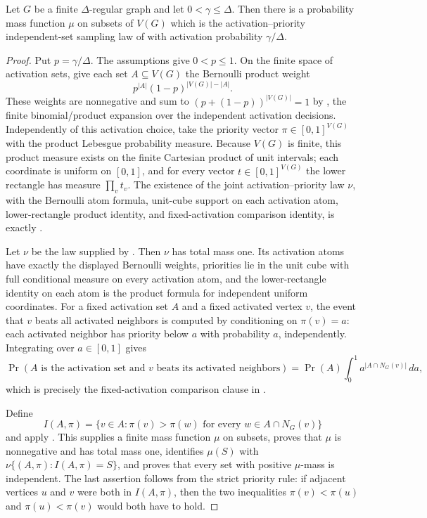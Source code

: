 \begin{lemma}
Let $G$ be a finite $\Delta$-regular graph and let $0<\gamma\le\Delta$.
Then there is a probability mass function $\mu$ on subsets of $V(G)$ which is
the activation--priority independent-set sampling law of
 with activation probability
$\gamma/\Delta$.
\end{lemma}
\begin{proof}
Put $p=\gamma/\Delta$.  The assumptions give $0<p\le 1$.  On the finite
space of activation sets, give each set $A\subseteq V(G)$ the Bernoulli
product weight
\[
p^{|A|}(1-p)^{|V(G)|-|A|}.
\]
These weights are nonnegative and sum to $(p+(1-p))^{|V(G)|}=1$ by
, the finite binomial/product
expansion over the independent activation decisions.
Independently of this activation choice, take the priority vector
\(\pi\in[0,1]^{V(G)}\) with the product Lebesgue probability measure.  Because
\(V(G)\) is finite, this product measure exists on the finite Cartesian
product of unit intervals; each coordinate is uniform on $[0,1]$, and for
every vector \(t\in[0,1]^{V(G)}\) the lower rectangle has measure
\(\prod_v t_v\).  The existence of the joint activation--priority law
\(\nu\), with the Bernoulli atom formula, unit-cube support on each activation
atom, lower-rectangle product identity, and fixed-activation comparison
identity, is exactly .

Let \(\nu\) be the law supplied by
.  Then \(\nu\) has total mass
one.  Its activation atoms have exactly the displayed Bernoulli weights,
priorities lie in the unit cube with full conditional measure on every
activation atom, and the lower-rectangle identity on each atom is the product
formula for independent uniform coordinates.
For a fixed activation set \(A\) and a fixed activated vertex \(v\), the event
that \(v\) beats all activated neighbors is computed by conditioning on
\(\pi(v)=a\): each activated neighbor has priority below \(a\) with
probability \(a\), independently.  Integrating over \(a\in[0,1]\) gives
\[
\Pr(A\text{ is the activation set and }v\text{ beats its activated
neighbors})
=\Pr(A)\int_0^1 a^{|A\cap N_G(v)|}\,da,
\]
which is precisely the fixed-activation comparison clause in
.

Define
\[
I(A,\pi)=\{v\in A:\pi(v)>\pi(w)\text{ for every }w\in A\cap N_G(v)\}
\]
and apply .  This
supplies a finite mass function \(\mu\) on subsets, proves that \(\mu\) is
nonnegative and has total mass one, identifies \(\mu(S)\) with
\(\nu\{(A,\pi):I(A,\pi)=S\}\), and proves that every set with positive
\(\mu\)-mass is independent.  The last assertion follows from the strict
priority rule: if adjacent vertices \(u\) and \(v\) were both in
\(I(A,\pi)\), then the two inequalities \(\pi(v)<\pi(u)\) and
\(\pi(u)<\pi(v)\) would both have to hold.


\end{proof}
